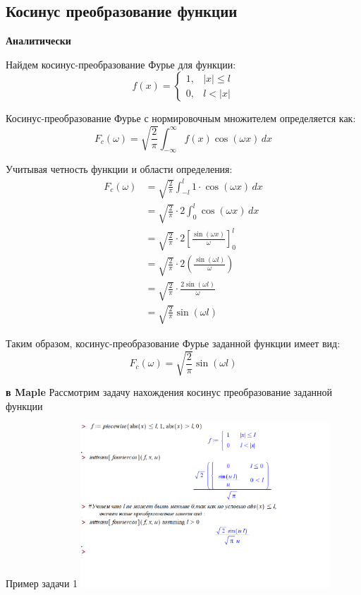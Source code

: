 \subsection{Косинус преобразование функции}{
  \textbf{Аналитически}


  Найдем косинус-преобразование Фурье для функции:
  \[
  f(x) = \begin{cases}
  1, & |x| \leq l \\
  0, & l < |x|
  \end{cases}
  \]
  
  Косинус-преобразование Фурье с нормировочным множителем определяется как:
  \[
  F_c(\omega) = \sqrt{\frac{2}{\pi}} \int_{-\infty}^{\infty} f(x) \cos(\omega x) \, dx
  \]
  
  Учитывая четность функции и области определения:
  \begin{equation}
  \begin{split}
  F_c(\omega) &= \sqrt{\frac{2}{\pi}} \int_{-l}^{l} 1 \cdot \cos(\omega x) \, dx \\
  &= \sqrt{\frac{2}{\pi}} \cdot 2\int_{0}^{l} \cos(\omega x) \, dx \\
  &= \sqrt{\frac{2}{\pi}} \cdot 2 \left[\frac{\sin(\omega x)}{\omega}\right]_{0}^{l} \\
  &= \sqrt{\frac{2}{\pi}} \cdot 2 \left(\frac{\sin(\omega l)}{\omega}\right) \\
  &= \sqrt{\frac{2}{\pi}} \cdot \frac{2\sin(\omega l)}{\omega} \\
  &= \sqrt{\frac{2}{\pi}} \sin(\omega l)
  \end{split}
  \end{equation}
  
  Таким образом, косинус-преобразование Фурье заданной функции имеет вид:
  \[
  F_c(\omega) = \sqrt{\frac{2}{\pi}} \sin(\omega l)
  \]
  }

  \textbf{в Maple}
  Рассмотрим задачу нахождения косинус преобразование заданной функции
  \begin{center}Пример задачи 1
    \includegraphics[width=0.7\textwidth]{practice_2.png}  
    \end{center}
   
